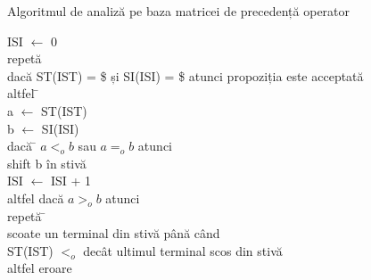 \documentclass[pdf]{beamer}
\begin{document}
\begin{frame}{Algoritmul de analiză pe baza matricei de precedență operator}
\begin{tabbing}
ISI $\leftarrow$ 0 \\

repetă \= \\

\> dacă ST(IST) = \$ și SI(ISI) = \$ atunci propoziția este acceptată \\

\> altfel \= \+ \\

\> a $\leftarrow$ ST(IST) \\

\> b $\leftarrow$ SI(ISI) \\

\> dacă \= $a <_o b$ sau $a =_o b$ atunci \+ \\

\> shift b în stivă \\

\> ISI $\leftarrow$ ISI + 1 \- \\

\> altfel dacă $a >_o b$ atunci  \\

\> repetă \= \+ \\

\> scoate un terminal din stivă până când \\

\> ST(IST) $<_o$ decât ultimul terminal scos din stivă \\

altfel eroare \\
\end{tabbing}
\end{frame}
\end{document}
